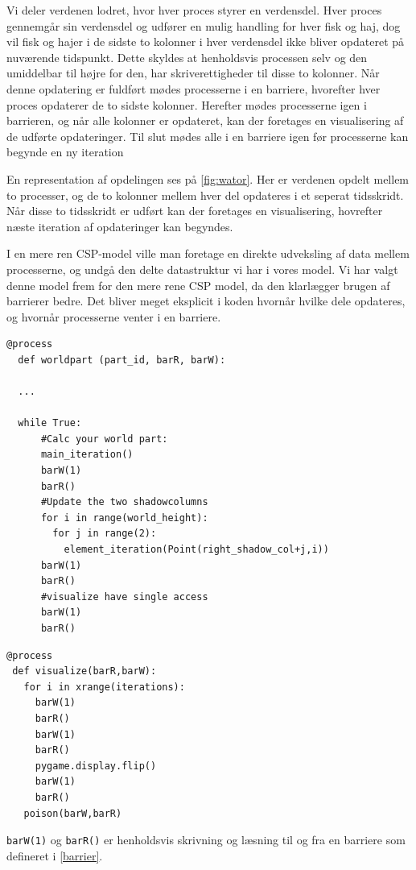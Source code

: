 Vi deler verdenen lodret, hvor hver proces styrer en verdensdel. Hver proces 
gennemgår sin verdensdel og udfører en mulig handling for hver fisk og haj, dog 
vil fisk og hajer i de sidste to kolonner i hver verdensdel ikke bliver 
opdateret på nuværende tidspunkt. Dette skyldes at henholdsvis processen selv 
og den umiddelbar til højre for den, har skriverettigheder til disse to 
kolonner.
Når denne opdatering er fuldført mødes processerne i en barriere, hvorefter 
hver proces opdaterer de to sidste kolonner. Herefter mødes processerne igen i 
barrieren, og når alle kolonner er opdateret, kan der foretages en 
visualisering af de udførte opdateringer. Til slut mødes alle i en barriere 
igen før processerne kan begynde en ny iteration 

En representation af opdelingen ses på \autoref{fig:wator}. Her er verdenen 
opdelt mellem to processer, og de to kolonner mellem hver del opdateres i et 
seperat tidsskridt. Når disse to tidsskridt er udført kan der foretages en 
visualisering, hovrefter næste iteration af opdateringer kan begyndes.  

I en mere ren CSP-model ville man foretage en direkte udveksling af data mellem 
processerne, og undgå den delte datastruktur vi har i vores model.  Vi har 
valgt denne model frem for den mere rene CSP model, da den klarlægger brugen af 
barrierer bedre.  Det bliver meget eksplicit i koden hvornår hvilke dele 
opdateres, og hvornår processerne venter i en barriere.

\noindent 
\begin{minipage}{\linewidth}
\begin{lstlisting}[label=wator-worldpart,caption=Uddrag af processen 
  \emph{worldpart} i Wator]
  @process
  def worldpart (part_id, barR, barW):
  
  ...
  
  while True:
      #Calc your world part:
      main_iteration()
      barW(1)
      barR()
      #Update the two shadowcolumns
      for i in range(world_height):
        for j in range(2):
          element_iteration(Point(right_shadow_col+j,i))
      barW(1)
      barR()
      #visualize have single access
      barW(1)
      barR()
\end{lstlisting}

\begin{lstlisting}[label=wator-visualize,caption=Processen \emph{visualize} i 
  Wator]
@process
 def visualize(barR,barW):
   for i in xrange(iterations):
     barW(1)
     barR()
     barW(1)
     barR()
     pygame.display.flip()
     barW(1)
     barR()
   poison(barW,barR)
\end{lstlisting}

\texttt{barW(1)} og \texttt{barR()} er henholdsvis skrivning og læsning til og 
fra en barriere som defineret i \vref{barrier}. 

\end{minipage}

